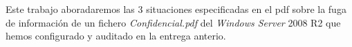 Este trabajo aboradaremos las 3 situaciones especificadas en el pdf sobre la fuga de información de un fichero \textit{Confidencial.pdf} del \textit{Windows Server} 2008 R2 que hemos configurado y auditado en la entrega anterio.
